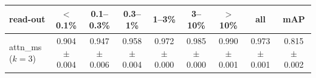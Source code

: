 \begin{tabular}{lcccccccc}
\toprule
read-out & $<$0.1\% & 0.1--0.3\% & 0.3--1\% & 1--3\% & 3--10\% & $>$10\% & all & mAP \\
\midrule
attn\_ms ($k=3$) & 0.904 $\pm$ 0.004 & 0.947 $\pm$ 0.006 & 0.958 $\pm$ 0.004 & 0.972 $\pm$ 0.000 & 0.985 $\pm$ 0.000 & 0.990 $\pm$ 0.001 & 0.973 $\pm$ 0.001 & 0.815 $\pm$ 0.002 \\
\bottomrule
\end{tabular}
